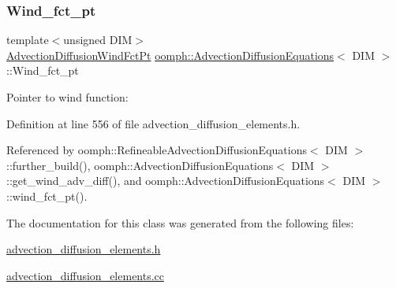 \subsubsection{\texorpdfstring{Wind\+\_\+fct\+\_\+pt}{Wind\_fct\_pt}}
{\footnotesize\ttfamily template$<$unsigned D\+IM$>$ \\
\hyperlink{classoomph_1_1AdvectionDiffusionEquations_a341db90b2eaf704f3286a9fcde7c614a}{Advection\+Diffusion\+Wind\+Fct\+Pt} \hyperlink{classoomph_1_1AdvectionDiffusionEquations}{oomph\+::\+Advection\+Diffusion\+Equations}$<$ D\+IM $>$\+::Wind\+\_\+fct\+\_\+pt\hspace{0.3cm}{\ttfamily [protected]}}



Pointer to wind function\+: 



Definition at line 556 of file advection\+\_\+diffusion\+\_\+elements.\+h.



Referenced by oomph\+::\+Refineable\+Advection\+Diffusion\+Equations$<$ D\+I\+M $>$\+::further\+\_\+build(), oomph\+::\+Advection\+Diffusion\+Equations$<$ D\+I\+M $>$\+::get\+\_\+wind\+\_\+adv\+\_\+diff(), and oomph\+::\+Advection\+Diffusion\+Equations$<$ D\+I\+M $>$\+::wind\+\_\+fct\+\_\+pt().



The documentation for this class was generated from the following files\+:\begin{DoxyCompactItemize}
\item 
\hyperlink{advection__diffusion__elements_8h}{advection\+\_\+diffusion\+\_\+elements.\+h}\item 
\hyperlink{advection__diffusion__elements_8cc}{advection\+\_\+diffusion\+\_\+elements.\+cc}\end{DoxyCompactItemize}

